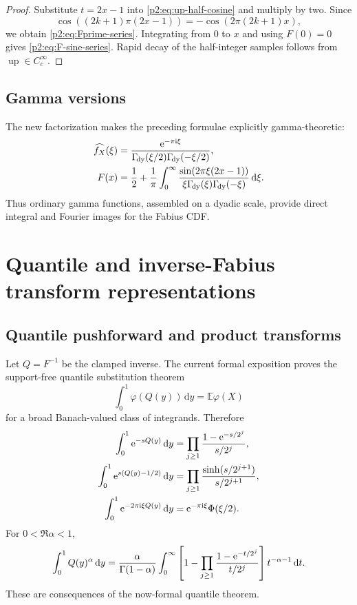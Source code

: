 \documentclass[11pt]{article}
\theoremstyle{definition}
\theoremstyle{remark}
\newcommand{\E}{\mathbb E}
\newcommand{\dd}{\,\mathrm d}
\newcommand{\Up}{\operatorname{up}}
\begin{document}
\begin{proof}
Substitute $t=2x-1$ into \eqref{p2:eq:up-half-cosine} and multiply by two.  Since
\[
 \cos((2k+1)\pi(2x-1))=-\cos(2\pi(2k+1)x),
\]
we obtain \eqref{p2:eq:Fprime-series}.  Integrating from $0$ to $x$ and using $F(0)=0$ gives
\eqref{p2:eq:F-sine-series}.  Rapid decay of the half-integer samples follows from
$\Up\in C_c^\infty$.
\end{proof}

\subsection{Gamma versions}

The new factorization makes the preceding formulae explicitly gamma-theoretic:
\begin{align}
 \widehat{f_X}(\xi)
 &=\frac{\e^{-\pi\ii\xi}}
 {\GammaDy(\xi/2)\GammaDy(-\xi/2)},                       \label{p2:eq:fX-gamma}\\
 F(x)
 &=\frac12+\frac1\pi\int_0^\infty
 \frac{\sin(2\pi\xi(2x-1))}
 {\xi\GammaDy(\xi)\GammaDy(-\xi)}\dd\xi.              \label{p2:eq:F-gamma-again}
\end{align}
Thus ordinary gamma functions, assembled on a dyadic scale, provide direct integral and
Fourier images for the Fabius CDF.

\section{Quantile and inverse-Fabius transform representations}
\label{p2:sec:inverse-fourier}

\subsection{Quantile pushforward and product transforms}

Let $Q=F^{-1}$ be the clamped inverse.  The current formal exposition proves the support-free
quantile substitution theorem
\begin{equation}
 \int_0^1\varphi(Q(y))\dd y=\E\varphi(X)                 \label{p2:eq:quantile-substitution}
\end{equation}
for a broad Banach-valued class of integrands.  Therefore
\begin{align}
 \int_0^1\e^{-sQ(y)}\dd y
 &=\prod_{j\ge1}\frac{1-\e^{-s/2^j}}{s/2^j},             \label{p2:eq:Q-Laplace}\\
 \int_0^1\e^{s(Q(y)-1/2)}\dd y
 &=\prod_{j\ge1}\frac{\sinh(s/2^{j+1})}{s/2^{j+1}},     \label{p2:eq:Q-centered-MGF}\\
 \int_0^1\e^{-2\pi\ii\xi Q(y)}\dd y
 &=\e^{-\pi\ii\xi}\Phi(\xi/2).                        \label{p2:eq:Q-characteristic}
\end{align}
For $0<\Re\alpha<1$,
\begin{equation}
 \int_0^1Q(y)^\alpha\dd y
 =\frac{\alpha}{\Gamma(1-\alpha)}\int_0^\infty
 \left[1-\prod_{j\ge1}\frac{1-\e^{-t/2^j}}{t/2^j}\right]
 t^{-\alpha-1}\dd t.                                    \label{p2:eq:Q-fractional-moment}
\end{equation}
These are \Derived consequences of the now-formal quantile theorem.
\end{document}
